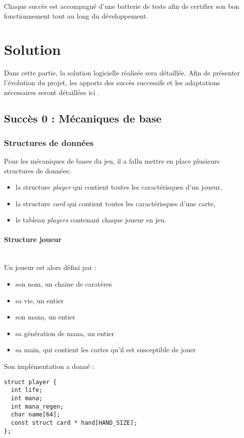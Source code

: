 \documentclass[12pt]{article}
\begin{document}
Chaque succès est accompagné d'une batterie de tests afin de certifier son bon fonctionnement tout au long du développement.

\newpage
\section{Solution}

Dans cette partie, la solution logicielle réalisée sera détaillée. Afin de présenter l'évolution du projet, les apports des succès successifs et les adaptations nécessaires seront détaillées ici .

\subsection{Succès 0 : Mécaniques de base}
\subsubsection{Structures de données}
Pour les mécaniques de bases du jeu, il a fallu mettre en place plusieurs structures de données:
\begin{itemize}
\item la structure \textit{player} qui contient toutes les caractérisques d'un joueur,
\item la structure \textit{card} qui contient toutes les caractérisques d'une carte,
\item le tableau \textit{players} contenant chaque joueur en jeu.
\end{itemize}
\smallbreak
\paragraph{Structure joueur} ~\\
\smallbreak
Un joueur est alors défini par :
\begin{itemize}
\item son nom, un chaine de caratères
\item sa vie, un entier
\item son mana, un entier
\item sa génération de mana, un entier
\item sa main, qui contient les cartes qu'il est susceptible de jouer
\end{itemize}

Son implémentation a donné :
\begin{verbatim}
struct player {
  int life;
  int mana;
  int mana_regen;
  char name[64];
  const struct card * hand[HAND_SIZE];
};
\end{verbatim}
\end{document}
